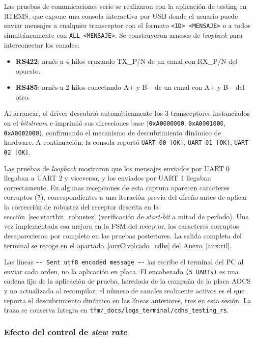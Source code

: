 Las pruebas de comunicaciones serie se realizaron con la aplicación de testing en RTEMS,
que expone una consola interactiva por USB donde el usuario puede enviar mensajes a
cualquier transceptor con el formato \texttt{<ID> <MENSAJE>} o a todos simultáneamente con
\texttt{ALL <MENSAJE>}. Se construyeron arneses de \textit{loopback} para interconectar los canales:

\begin{itemize}
    \item \textbf{RS422}: arnés a 4 hilos cruzando TX\_P/N de un canal con RX\_P/N del opuesto.
    \item \textbf{RS485}: arnés a 2 hilos conectando A+ y B$-$ de un canal con A+ y B$-$ del otro.
\end{itemize}

Al arrancar, el driver descubrió automáticamente los 3 transceptores instanciados en el
\textit{bitstream} e imprimió sus direcciones base (\texttt{0xA0000000}, \texttt{0xA0001000},
\texttt{0xA0002000}), confirmando el mecanismo de descubrimiento dinámico de hardware. A
continuación, la consola reportó \texttt{UART 00 [OK]}, \texttt{UART 01 [OK]},
\texttt{UART 02 [OK]}.

Las pruebas de \textit{loopback} mostraron que los mensajes enviados por UART 0 llegaban a
UART 2 y viceversa, y los enviados por UART 1 llegaban correctamente. En algunas
recepciones de esta captura aparecen caracteres corruptos (\texttt{?}), correspondientes a
una iteración previa del diseño antes de aplicar la corrección de robustez del receptor
descrita en la sección~\ref{sec:startbit_robustez} (verificación de \textit{start-bit} a mitad de período). Una
vez implementada esa mejora en la FSM del receptor, los caracteres corruptos desaparecieron
por completo en las pruebas posteriores. La salida completa del terminal se recoge en el
apartado~\ref{anxC:volcado_cdhs} del Anexo~\ref{anx:rtl}.

Las líneas \texttt{---- Sent utf8 encoded message ----} las escribe el terminal del PC al enviar
cada orden, no la aplicación en placa. El encabezado \texttt{(5 UARTs)} es una cadena fija de la
aplicación de prueba, heredada de la campaña de la placa AOCS y no actualizada al recompilar; el
número de canales realmente activos es el que reporta el descubrimiento dinámico en las líneas
anteriores, tres en esta sesión. La traza se conserva íntegra en
\texttt{tfm/\_docs/\allowbreak logs\_terminal/\allowbreak cdhs\_testing\_rs}.

\subsubsection{Efecto del control de \textit{slew rate}}


